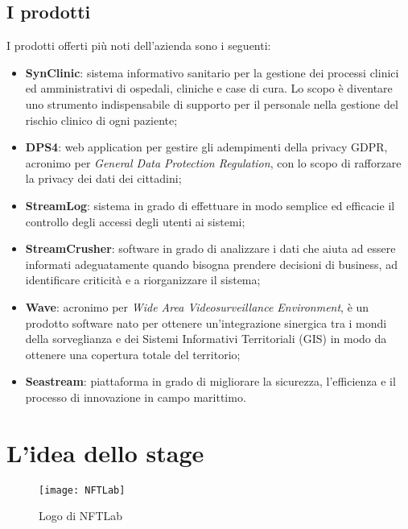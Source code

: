 \subsection{I prodotti}

I prodotti offerti più noti dell'azienda sono i seguenti:
\begin{itemize}
	\item \textbf{SynClinic}: sistema informativo sanitario per la gestione dei processi clinici ed amministrativi di ospedali, cliniche e case di cura. Lo scopo è diventare uno strumento indispensabile di supporto per il personale nella gestione del rischio clinico di ogni paziente;
	\item \textbf{DPS4}: web application per gestire gli adempimenti della privacy GDPR, acronimo per \textit{General Data Protection Regulation}, con lo scopo di rafforzare la privacy dei dati dei cittadini;
	\item \textbf{StreamLog}: sistema in grado di effettuare in modo semplice ed efficacie il controllo degli accessi degli utenti ai sistemi;
	\item \textbf{StreamCrusher}: software in grado di analizzare i dati che aiuta ad essere informati adeguatamente quando bisogna prendere decisioni di business, ad identificare criticità e a riorganizzare il sistema;
	\item \textbf{Wave}: acronimo per \textit{Wide Area Videosurveillance Environment}, è un prodotto software nato per ottenere un'integrazione sinergica tra i mondi della sorveglianza e dei Sistemi Informativi Territoriali (GIS) in modo da ottenere una copertura totale del territorio;
	\item \textbf{Seastream}: piattaforma in grado di migliorare la sicurezza, l'efficienza e il processo di innovazione in campo marittimo.
\end{itemize}

\section{L'idea dello stage}

\begin{figure}[H]
	\begin{center}
		\texttt{[image: NFTLab]}
		\caption{Logo di NFTLab}
	\end{center}
\end{figure}

